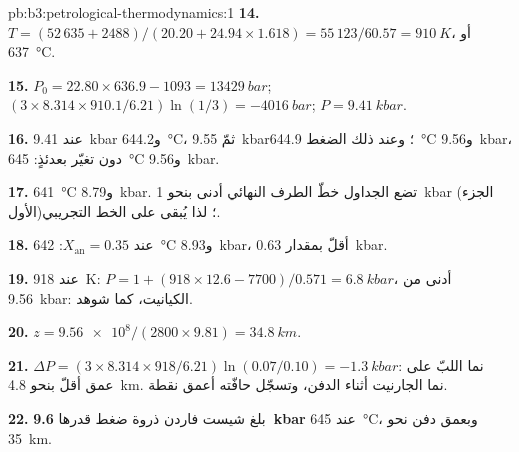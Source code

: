 \begin{solution}{pb:b3:petrological-thermodynamics:1}
\textbf{14.} $T = (52\,635 + 2488)/(20.20 + 24.94\times1.618) = 55\,123/60.57
= \qty{910}{K}$، أو \qty{637}{\celsius}.

\textbf{15.} $P_0 = 22.80\times636.9 - 1093 = \qty{13429}{bar}$; $(3\times8.314
\times910.1/6.21)\ln(1/3) = \qty{-4016}{bar}$; $P = \qty{9.41}{kbar}$.

\textbf{16.} عند \qty{9.41}{kbar} و\qty{644.2}{\celsius}، ثمّ
\qty{9.55}{kbar}؛ وعند ذلك الضغط \qty{644.9}{\celsius}
و\qty{9.56}{kbar}، دون تغيّر بعدئذٍ: \qty{645}{\celsius}
و\qty{9.56}{kbar}.

\textbf{17.} \qty{641}{\celsius} و\qty{8.79}{kbar}. تضع الجداول خطّ الطرف النهائي
أدنى بنحو \qty{1}{kbar} (الجزء الأول)؛ لذا
يُبقى على الخط التجريبي.

\textbf{18.} عند $X_{\text{an}} = 0.35$: \qty{642}{\celsius}
و\qty{8.93}{kbar}، أقلّ بمقدار \qty{0.63}{kbar}.

\textbf{19.} عند \qty{918}{K}: $P = 1 + (918\times12.6 - 7700)/0.571 =
\qty{6.8}{kbar}$، أدنى من \qty{9.56}{kbar}: الكيانيت، كما شوهد.

\textbf{20.} $z = \num{9.56e8}/(2800\times9.81) = \qty{34.8}{km}$.

\textbf{21.} $\Delta P = (3\times8.314\times918/6.21)\ln(0.07/0.10) =
\qty{-1.3}{kbar}$: نما اللبّ على عمق أقلّ بنحو \qty{4.8}{km}. نما الجارنيت
أثناء الدفن، وتسجّل حافّته أعمق نقطة.

\textbf{22.} بلغ شيست فاردن ذروة ضغط قدرها
\textbf{\qty[text-series-to-math=true]{9.6}{kbar}} عند
\qty{645}{\celsius}، وبعمق دفن نحو \qty{35}{km}.
\end{solution}
